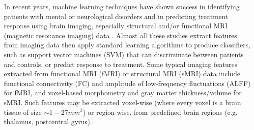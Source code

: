 \documentclass{article}
\begin{document}
In recent years, machine learning techniques have shown success in identifying patients with mental or neurological disorders and in predicting treatment response using brain imaging, especially structural and/or functional MRI (magnetic resonance imaging) data \citep{Orru2012, Zarogianni2013, Koutsouleris2016, Vieira2017, Gheiratmand2017}. Almost all these studies extract features from imaging data then apply standard learning algorithms to produce classifiers, such as support vector machines (SVM) \citep{Orru2012, Wolfers2015} that can discriminate between patients and controls, or predict response to treatment.
Some typical imaging features extracted from functional MRI (fMRI) or structural MRI (sMRI) data include functional connectivity (FC) and amplitude of low-frequency fluctuations (ALFF) for fMRI, and voxel-based morphometry and gray matter thickness/volume for sMRI. Such features may be extracted voxel-wise (where every voxel is a brain tissue of size $ \sim 1-27 mm^3$) or region-wise, from predefined brain regions (e.g. thalamus, postcentral gyrus).
\end{document}

